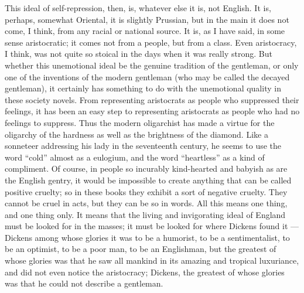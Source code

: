 This ideal of self-repression, then, is, whatever else it is, not English. It is, perhaps, somewhat Oriental, it is slightly Prussian, but in the main it does not come, I think, from any racial or national source. It is, as I have said, in some sense aristocratic; it comes not from a people, but from a class. Even aristocracy, I think, was not quite so stoical in the days when it was really strong. But whether this unemotional ideal be the genuine tradition of the gentleman, or only one of the inventions of the modern gentleman (who may be called the decayed gentleman), it certainly has something to do with the unemotional quality in these society novels. From representing aristocrats as people who suppressed their feelings, it has been an easy step to representing aristocrats as people who had no feelings to suppress. Thus the modern oligarchist has made a virtue for the oligarchy of the hardness as well as the brightness of the diamond. Like a sonneteer addressing his lady in the seventeenth century, he seems to use the word “cold” almost as a eulogium, and the word “heartless” as a kind of compliment. Of course, in people so incurably kind-hearted and babyish as are the English gentry, it would be impossible to create anything that can be called positive cruelty; so in these books they exhibit a sort of negative cruelty. They cannot be cruel in acts, but they can be so in words. All this means one thing, and one thing only. It means that the living and invigorating ideal of England must be looked for in the masses; it must be looked for where Dickens found it — Dickens among whose glories it was to be a humorist, to be a sentimentalist, to be an optimist, to be a poor man, to be an Englishman, but the greatest of whose glories was that he saw all mankind in its amazing and tropical luxuriance, and did not even notice the aristocracy; Dickens, the greatest of whose glories was that he could not describe a gentleman.


